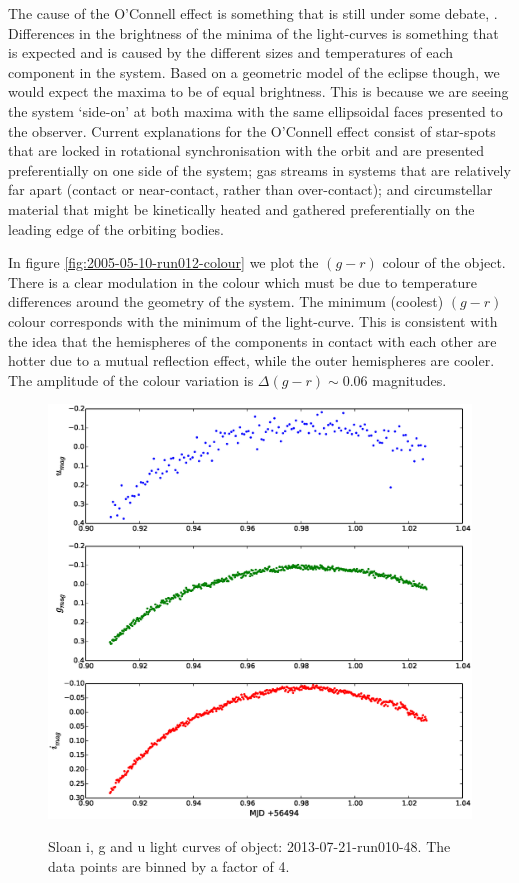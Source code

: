 The cause of the O'Connell effect is something that is still under some debate, \citep{oconnelleffect}. Differences in the brightness of the minima of the light-curves is something that is expected and is caused by the different sizes and temperatures of each component in the system. Based on a geometric model of the eclipse though, we would expect the maxima to be of equal brightness. This is because we are seeing the system `side-on' at both maxima with the same ellipsoidal faces presented to the observer. Current explanations for the O'Connell effect consist of star-spots that are locked in rotational synchronisation with the orbit and are presented preferentially on one side of the system; gas streams in systems that are relatively far apart (contact or near-contact, rather than over-contact); and circumstellar material that might be kinetically heated and gathered preferentially on the leading edge of the orbiting bodies.  

In figure \ref{fig:2005-05-10-run012-colour} we plot the $(g-r)$ colour of the object. There is a clear modulation in the colour which must be due to temperature differences around the geometry of the system. The minimum (coolest) $(g - r)$ colour corresponds with the minimum of the light-curve. This is consistent with the idea that the hemispheres of the components in contact with each other are hotter due to a mutual reflection effect, while the outer hemispheres are cooler. The amplitude of the colour variation is $\Delta{(g-r)} \sim 0.06$ magnitudes.


\newpage

\begin{figure}
  \includegraphics[width=120mm]{images/2013-07-21-run010-48_lightcurve-bin4.eps} 
  \label{fig:2013-07-21-run010-48}
  \caption{Sloan i, g and u light curves of object: 2013-07-21-run010-48. The data points are binned by a factor of 4.}
\end{figure}

